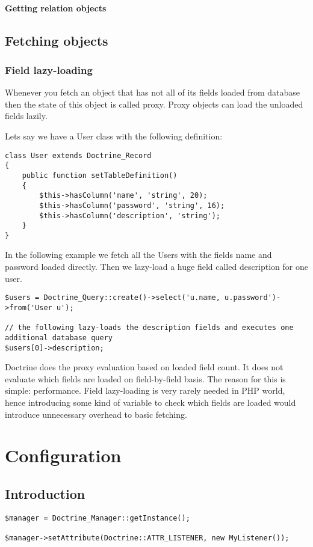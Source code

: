 \documentclass[11pt,a4paper]{report}
\begin{document}
\subsubsection{Getting relation objects}
\section{Fetching objects}
\subsection{Field lazy-loading}
Whenever you fetch an object that has not all of its fields loaded from database then the state of this object is called proxy. Proxy objects can load the unloaded fields lazily.

Lets say we have a User class with the following definition:

\begin{verbatim}
class User extends Doctrine_Record
{
    public function setTableDefinition()
    {
        $this->hasColumn('name', 'string', 20);
        $this->hasColumn('password', 'string', 16);
        $this->hasColumn('description', 'string');
    }
}
\end{verbatim}

In the following example we fetch all the Users with the fields name and password loaded directly. Then we lazy-load a huge field called description for one user.

\begin{verbatim}
$users = Doctrine_Query::create()->select('u.name, u.password')->from('User u');

// the following lazy-loads the description fields and executes one additional database query
$users[0]->description;
\end{verbatim}

Doctrine does the proxy evaluation based on loaded field count. It does not evaluate which fields are loaded on field-by-field basis. The reason for this is simple: performance. Field lazy-loading is very rarely needed in PHP world, hence introducing some kind of variable to check which fields are loaded would introduce unnecessary overhead to basic fetching.

\chapter{Configuration}
\section{Introduction}
\begin{verbatim}
$manager = Doctrine_Manager::getInstance();

$manager->setAttribute(Doctrine::ATTR_LISTENER, new MyListener());
\end{verbatim}
\end{document}
